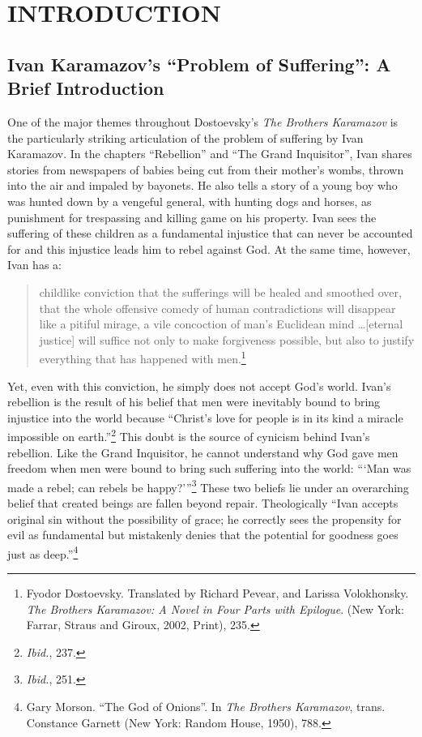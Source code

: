 \tableofcontents
\chapter{INTRODUCTION}

\pagestyle{myheadings}

\label{introduction}
\section{Ivan Karamazov's ``Problem of Suffering'': A Brief Introduction}
One of the major themes throughout Dostoevsky's \emph{The Brothers Karamazov} is the particularly striking articulation of the problem of suffering by Ivan Karamazov. In the chapters ``Rebellion'' and ``The Grand Inquisitor'', Ivan shares stories from newspapers of babies being cut from their mother's wombs, thrown into the air and impaled by bayonets. He also tells a story of a young boy who was hunted down by a vengeful general, with hunting dogs and horses, as punishment for trespassing and killing game on his property. Ivan sees the suffering of these children as a fundamental injustice that can never be accounted for and this injustice leads him to rebel against God. At the same time, however, Ivan has a:

\begin{quote}
\singlespacing
childlike conviction that the sufferings will be healed and smoothed over, that the whole offensive comedy of human contradictions will disappear like a pitiful mirage, a vile concoction of man's Euclidean mind \ldots [eternal justice] will suffice not only to make forgiveness possible, but also to justify everything that has happened with men.\footnote{Fyodor Dostoevsky. Translated by Richard Pevear, and Larissa Volokhonsky. \emph{The Brothers Karamazov: A Novel in Four Parts with Epilogue}. (New York: Farrar, Straus and Giroux, 2002, Print), 235.}
\end{quote}

Yet, even with this conviction, he simply does not accept God's world. Ivan's rebellion is the result of his belief that men were inevitably bound to bring injustice into the world because ``Christ's love for people is in its kind a miracle impossible on earth.''\footnote{\emph{Ibid.}, 237.} This doubt is the source of cynicism behind Ivan's rebellion. Like the Grand Inquisitor, he cannot understand why God gave men freedom when men were bound to bring such suffering into the world: ``\thinspace`Man was made a rebel; can rebels be happy?'\thinspace''\footnote{\emph{Ibid.}, 251.} These two beliefs lie under an overarching belief that created beings are fallen beyond repair. Theologically ``Ivan accepts original sin without the possibility of grace; he correctly sees the propensity for evil as fundamental but mistakenly denies that the potential for goodness goes just as deep.''\footnote{Gary Morson. ``The God of Onions''. In \emph{The Brothers Karamazov}, trans. Constance Garnett (New York: Random House, 1950), 788.}

